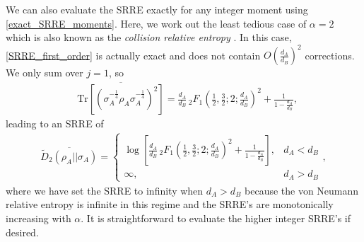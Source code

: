 \documentclass[a4paper,11pt]{article}
\newcommand{\Tr}{\text{Tr}}
\newcommand*{\JKF}[1]{\textcolor{blue}{[JKF: #1]}}
\newcommand*{\SR}[1]{\textcolor{magenta}{[SR: \textsf{#1}]}}
\begin{document}
We can also evaluate the SRRE exactly for any integer moment using \eqref{exact_SRRE_moments}. Here, we work out the least tedious case of $\alpha = 2$ which is also known as the \textit{collision relative entropy} \cite{2005PhDT.......176R}. In this case, \eqref{SRRE_first_order} is actually exact and does not contain $O\left(\frac{d_A}{d_B}\right)^2$ corrections. We only sum over $j = 1$, so
\begin{align}
    &\overline{\Tr\left[ \left(\sigma_A^{-\frac{1}{4}}\rho_A \sigma_A^{-\frac{1}{4}}\right)^2\right]} =\frac{d_A}{d_B}\, _2F_1\left(\frac{1}{{2}},\frac{3}{{2}}
   ;2;\frac{d_A}{d_B}\right)^2+\frac{1}{1-\frac{d_A}{d_B}},
\end{align}
leading to an SRRE of
\begin{align}
    \overline{\tilde{D}_2(\rho_A || \sigma_A)} = \begin{cases}\log\left[\frac{d_A}{d_B}\, _2F_1\left(\frac{1}{{2}},\frac{3}{{2}}
   ;2;\frac{d_A}{d_B}\right)^2+\frac{1}{1-\frac{d_A}{d_B}}\right], & d_A < d_B
   \\
   \infty, & d_A > d_B
   \end{cases},
   \label{SRRE2_eq}
\end{align}
where we have set the SRRE to infinity when $d_A > d_B$ because the von Neumann relative entropy is infinite in this regime and the SRRE's are monotonically increasing with $\alpha$.
It is straightforward to evaluate the higher integer SRRE's if desired. 
\end{document}
